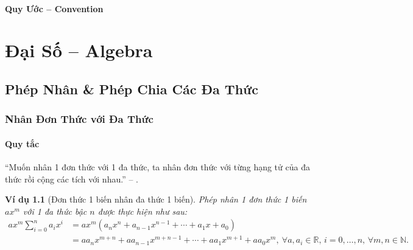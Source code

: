 \documentclass[oneside]{book}
\numberwithin{equation}{section}
\newtheorem{vidu}{Ví dụ}[section]
\begin{document}
\subsection*{Quy Ước -- Convention}


\mainmatter
\part{Đại Số -- Algebra}

\chapter{Phép Nhân \& Phép Chia Các Đa Thức}

\section{Nhân Đơn Thức với Đa Thức}

\subsection{Quy tắc}
``Muốn nhân 1 đơn thức với 1 đa thức, ta nhân đơn thức với từng hạng tử của đa thức rồi cộng các tích với nhau.'' -- \cite[p. 4]{SGK_Toan_8_tap_1}.

\begin{vidu}[Đơn thức 1 biến nhân đa thức 1 biến]
	Phép nhân 1 đơn thức 1 biến $ax^m$ với 1 đa thức bậc $n$ được thực hiện như sau:
	\begin{align*}
		ax^m\sum_{i=0}^n a_ix^i &= ax^m\left(a_nx^n + a_{n-1}x^{n-1} + \cdots + a_1x + a_0\right)\\
		&= aa_nx^{m+n} + aa_{n-1}x^{m+ n-1} + \cdots + aa_1x^{m+1} + aa_0x^m,\ \forall a,a_i\in\mathbb{R},\,i = 0,\ldots,n,\,\forall m,n\in\mathbb{N}.
	\end{align*}
\end{vidu}
\end{document}
